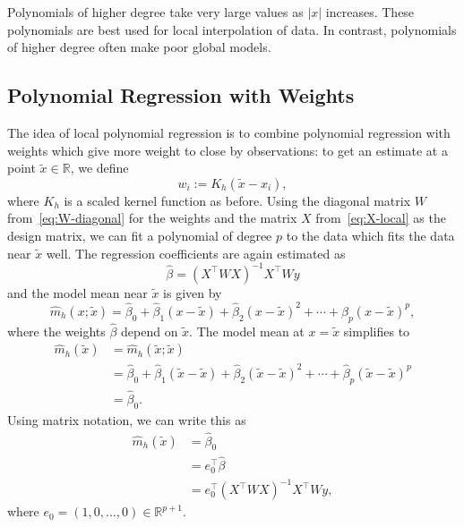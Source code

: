 \documentclass[
  a4paper,
]{article}
\theoremstyle{definition}
\theoremstyle{definition}
\theoremstyle{definition}
\theoremstyle{definition}
\theoremstyle{remark}
\begin{document}
Polynomials of higher degree take very large values as \(|x|\) increases.
These polynomials are best used for local interpolation of data.
In contrast, polynomials of higher degree often make poor global models.

\hypertarget{polynomial-regression-with-weights}{%
\subsection{Polynomial Regression with Weights}\label{polynomial-regression-with-weights}}

The idea of local polynomial regression is to combine polynomial regression
with weights which give more weight to close by observations: to get an
estimate at a point \(\tilde x \in \mathbb{R}\), we define
\begin{equation*}
  w_i
  := K_h(\tilde x - x_i),
\end{equation*}
where \(K_h\) is a scaled kernel function as before. Using the diagonal
matrix \(W\) from~\eqref{eq:W-diagonal} for the weights and the matrix
\(X\) from~\eqref{eq:X-local} as the design matrix, we can fit a polynomial
of degree \(p\) to the data which fits the data near \(\tilde x\) well.
The regression coefficients are again estimated as
\begin{equation*}
  \hat\beta
  = (X^\top W X)^{-1} X^\top W y
\end{equation*}
and the model mean near \(\tilde x\) is given by
\begin{equation*}
  \hat m_h(x; \tilde x)
  = \hat\beta_0 + \hat\beta_1 (x - \tilde x) + \hat\beta_2 (x - \tilde x)^2 + \cdots + \hat\beta_p (x - \tilde x)^p,
\end{equation*}
where the weights \(\hat\beta\) depend on \(\tilde x\). The model mean at
\(x = \tilde x\) simplifies to
\begin{align*}
  \hat m_h(\tilde x)
  &= \hat m_h(\tilde x; \tilde x) \\
  &= \hat\beta_0 + \hat\beta_1 (\tilde x - \tilde x) + \hat\beta_2 (\tilde x - \tilde x)^2 + \cdots + \hat\beta_p (\tilde x - \tilde x)^p \\
  &= \hat\beta_0.
\end{align*}
Using matrix notation, we can write this as
\begin{align*}
  \hat m_h(\tilde x)
  &= \hat\beta_0 \\
  &= e_0^\top \hat\beta \\
  &= e_0^\top (X^\top W X)^{-1} X^\top W y,
\end{align*}
where \(e_0 = (1, 0, \ldots, 0) \in \mathbb{R}^{p+1}\).
\end{document}
